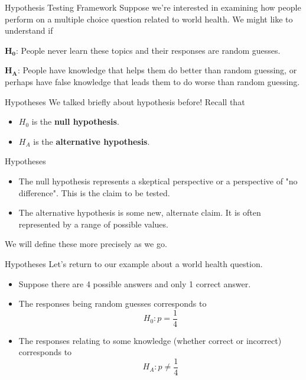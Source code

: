 
\begin{frame}{Hypothesis Testing Framework}
    Suppose we're interested in examining how people perform on a multiple choice question related to world health. We might like to understand if
    
    \vspace{12pt}$\boldsymbol{H_0}$: People never learn these topics and their responses are random guesses.
    
    \vspace{12pt}$\boldsymbol{H_A}$: People have knowledge that helps them do better than random guessing, or perhaps have false knowledge that leads them to do worse than random guessing.
\end{frame}

\begin{frame}{Hypotheses}
    We talked briefly about hypothesis before! Recall that
    \begin{itemize}
        \item $H_0$ is the \textbf{null hypothesis}.
        \item $H_A$ is the \textbf{alternative hypothesis}.
    \end{itemize}
\end{frame}

\begin{frame}{Hypotheses}
    \begin{itemize}
        \item The null hypothesis represents a skeptical perspective or a perspective of "no difference". This is the claim to be tested.
        \item The alternative hypothesis is some new, alternate claim. It is often represented by a range of possible values.
    \end{itemize}
    We will define these more precisely as we go.
\end{frame}

\begin{frame}{Hypotheses}
    Let's return to our example about a world health question.  
    \begin{itemize}
        \item Suppose there are 4 possible answers and only 1 correct answer.
        \item The responses being random guesses corresponds to
        \[
            H_0: p = \frac{1}{4}
        \]
        \item The responses relating to some knowledge (whether correct or incorrect) corresponds to
        \[
            H_A: p \ne \frac{1}{4}
        \]
    \end{itemize}
\end{frame}

